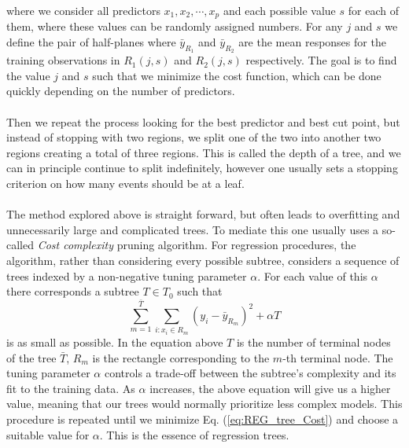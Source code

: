 \documentclass[12pt, a4paper]{book}
\begin{document}
where we consider all predictors $x_1,x_2,\cdots,x_p$ and each possible value $s$ for each of them, where these values can be randomly assigned numbers. For any $j$ and $s$ we define the pair of half-planes where $\bar{y}_{R_1}$ and $\bar{y}_{R_2}$ are the mean responses for the training 
observations in $R_1(j,s)$ and $R_2(j,s)$ respectively. The goal is to find the value $j$ and $s$ such that we minimize the cost function, which can be done quickly depending on the number of predictors.\\
\\Then we repeat the process looking for the best predictor and best cut point, but instead of stopping with two regions, we split one of the two into another two regions creating a total of three regions. This is called the depth of a tree, and we can in principle continue to split indefinitely, 
however one usually sets a stopping criterion on how many events should be at a leaf.\\
\\The method explored above is straight forward, but often leads to overfitting and unnecessarily large and complicated trees. To mediate this one usually uses a so-called \textit{Cost complexity} pruning algorithm. 
For regression procedures, the algorithm, rather than considering every possible subtree, considers a sequence of trees indexed by a non-negative tuning parameter $\alpha$. For each value of this $\alpha$ there corresponds a subtree $T\in T_0$ such that
\begin{equation}\label{eq:REG_tree_Cost}
    \sum_{m=1}^{\bar{T}}\sum_{i:x_i\in R_m}(y_i -\bar{y}_{R_m})^2 + \alpha T
\end{equation}
is as small as possible. In the equation above $T$ is the number of terminal nodes of the tree $\bar T$, $R_m$ is the rectangle corresponding to the $m$-th terminal node. The tuning parameter $\alpha$ controls a trade-off between the subtree's complexity and its fit to the training data. 
As $\alpha$ increases, the above equation will give us a higher value, meaning that our trees would normally prioritize less complex models. This procedure is repeated until we minimize Eq. (\ref{eq:REG_tree_Cost}) and choose a suitable value for $\alpha$. This is the essence of regression trees.
\end{document}
